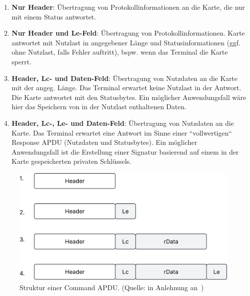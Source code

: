 \begin{enumerate}
    \itemsep0.5em
    \item \textbf{Nur Header}: Übertragung von Protokollinformationen an die Karte, die nur mit einem Status antwortet.
    \item \textbf{Nur Header und Le-Feld}: Übertragung von Protokollinformationen.
    Karte antwortet mit Nutzlast in angegebener Länge und Statusinformationen (ggf. ohne Nutzlast, falls Fehler auftritt), bspw. wenn das Terminal die Karte sperrt.
    \item \textbf{Header, Lc- und Daten-Feld}: Übertragung von Nutzdaten an die Karte mit der angeg. Länge. Das Terminal erwartet keine Nutzlast in der Antwort. Die Karte antwortet mit den Statusbytes. Ein möglicher Anwendungsfall wäre hier das Speichern von in der Nutzlast enthaltenen Daten.
    \item \textbf{Header, Lc-, Le- und Daten-Feld}: Übertragung von Nutzdaten an die Karte. Das Terminal erwartet eine Antwort im Sinne einer ``vollwertigen`` Response APDU (Nutzdaten und Statusbytes). Ein möglicher Anwendungsfall ist die Erstellung einer Signatur basierend auf einem in der Karte gespeicherten privaten Schlüssels.
\end{enumerate}



\begin{figure}
    \centering
    \includegraphics[scale=0.4]{aufgabe 1/img/cases.svg}
    \caption{Struktur einer Command APDU. (Quelle: in Anlehnung an~\cite[\textbf{Bild 6.41}, 431]{RF02})}
    \label{fig:cases}
\end{figure}
